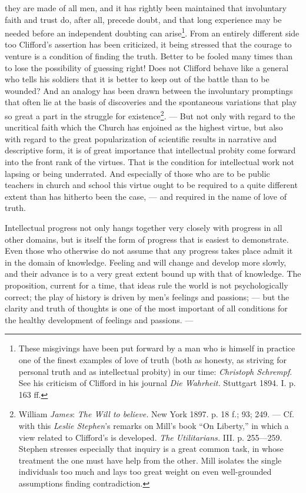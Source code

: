 \documentclass[12pt,a4paper,openany]{book}
\newcommand{\opage}[1]{\marginnote{\footnotesize\textit{[#1]}}}
\begin{document}
they are made of all men, and it has rightly been maintained that involuntary faith and trust do, after all, precede
doubt, and that long experience may be needed before an independent doubting can arise\footnote[1]{These misgivings have
been put forward by a man who is himself in practice one of the finest examples of love of truth (both as honesty, as
striving for personal truth and as intellectual probity) in our time: \emph{Christoph Schrempf}. See his criticism of
Clifford in his journal \textit{Die Wahrheit.} Stuttgart 1894. I. p. 163 ff.}. From an entirely different side too
Clifford's assertion has been criticized, it being stressed that the courage to venture is a condition of finding the
truth. Better to be fooled many times than to lose the possibility of guessing right! Does not Clifford behave like a
general who tells his soldiers that it is better to keep out of the battle than to be wounded? And an analogy has been
drawn between the involuntary promptings that often lie at the basis of discoveries and the spontaneous variations that
play so great a part in the struggle for existence\footnote[2]{William \emph{James}: \textit{The Will to believe.} New
York 1897. p. 18 f.; 93; 249. --- Cf. with this \emph{Leslie Stephen}'s remarks on Mill's book ``On Liberty,'' in which a
view related to Clifford's is developed. \textit{The Utilitarians.} III. p. 255---259. Stephen stresses especially that
inquiry is a great common task, in whose treatment the one must have help from the other. Mill isolates the single
individuals too much and lays too great weight on even well-grounded assumptions finding contradiction.}.
--- But not only with regard to the uncritical faith which the Church
\opage{256}has enjoined as the highest virtue, but also with regard to the great popularization of scientific results
in narrative and descriptive form, it is of great importance that intellectual probity come forward into the front rank
of the virtues. That is the condition for intellectual work not lapsing or being underrated. And especially of those
who are to be public teachers in church and school this virtue ought to be required to a quite different extent than
has hitherto been the case, --- and required in the name of love of truth.

Intellectual progress not only hangs together very closely with progress in all other domains, but is itself the form
of progress that is easiest to demonstrate. Even those who otherwise do not assume that any progress takes place admit
it in the domain of knowledge. Feeling and will change and develop more slowly, and their advance is to a very great
extent bound up with that of knowledge. The proposition, current for a time, that ideas rule the world is not
psychologically correct; the play of history is driven by men's feelings and passions; --- but the clarity and truth
of thoughts is one of the most important of all conditions for the healthy development of feelings and passions. ---
\end{document}
